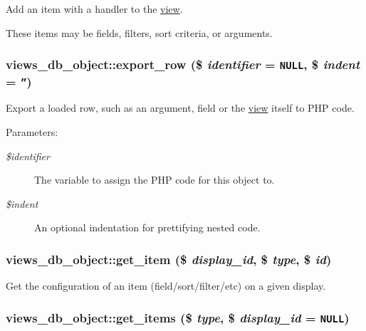 Add an item with a handler to the \hyperlink{classview}{view}.

These items may be fields, filters, sort criteria, or arguments. \hypertarget{classviews__db__object_0b0485d179ad553228534ae957e0ddc9}{
\subsubsection[{export\_\-row}]{\setlength{\rightskip}{0pt plus 5cm}views\_\-db\_\-object::export\_\-row (\$ {\em identifier} = {\tt NULL}, \/  \$ {\em indent} = {\tt ''})}}
\label{classviews__db__object_0b0485d179ad553228534ae957e0ddc9}


Export a loaded row, such as an argument, field or the \hyperlink{classview}{view} itself to PHP code.

\begin{Desc}
\item[Parameters:]
\begin{description}
\item[{\em \$identifier}]The variable to assign the PHP code for this object to. \item[{\em \$indent}]An optional indentation for prettifying nested code. \end{description}
\end{Desc}
\hypertarget{classviews__db__object_9c1010d4c58ebbda357940ac11c48ce1}{
\subsubsection[{get\_\-item}]{\setlength{\rightskip}{0pt plus 5cm}views\_\-db\_\-object::get\_\-item (\$ {\em display\_\-id}, \/  \$ {\em type}, \/  \$ {\em id})}}
\label{classviews__db__object_9c1010d4c58ebbda357940ac11c48ce1}


Get the configuration of an item (field/sort/filter/etc) on a given display. \hypertarget{classviews__db__object_20a7ac553af0e4e8ee6f676dce4b844b}{
\subsubsection[{get\_\-items}]{\setlength{\rightskip}{0pt plus 5cm}views\_\-db\_\-object::get\_\-items (\$ {\em type}, \/  \$ {\em display\_\-id} = {\tt NULL})}}
\label{classviews__db__object_20a7ac553af0e4e8ee6f676dce4b844b}


